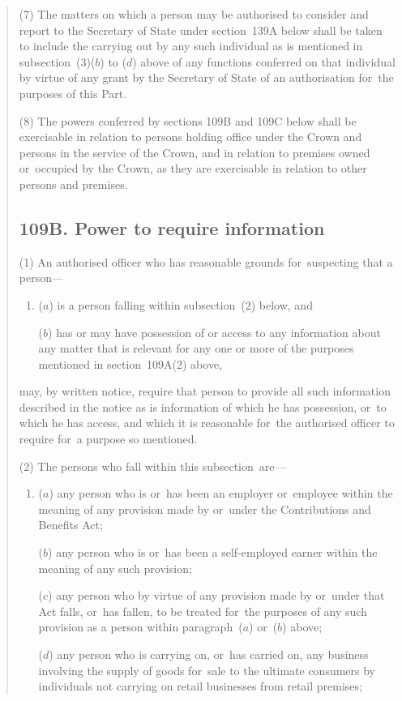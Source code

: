 \documentclass[12pt,a4paper]{article}
\begin{document}
\begin{quotation}
(7) The matters on which a person may be authorised to consider and report to the Secretary of State under section~139A below shall be taken to include the carrying out by any such individual as is mentioned in subsection~(3)($b$)  to ($d$)  above of any functions conferred on that individual by virtue of any grant by the Secretary of State of an authorisation for~the purposes of this Part.

(8) The powers conferred by sections 109B and 109C below shall be exercisable in relation to persons holding office under the Crown and persons in the service of the Crown, and in relation to premises owned or~occupied by the Crown, as they are exercisable in relation to other persons and premises.

\subsection*{109B. Power to require information}

(1) An authorised officer who has reasonable grounds for~suspecting that a person—
\begin{enumerate}\item[]
($a$) is a person falling within subsection~(2)  below, and

($b$) has or may have possession of or access to any information about any matter that is relevant for any one or more of the purposes mentioned in section~109A(2)  above,
\end{enumerate}
may, by written notice, require that person to provide all such information described in the notice as is information of which he has possession, or~to which he has access, and which it is reasonable for~the authorised officer to require for~a purpose so mentioned.

(2) The persons who fall within this subsection~are—
\begin{enumerate}\item[]
($a$) any person who is or~has been an employer or~employee within the meaning of any provision made by or~under the Contributions and Benefits Act;

($b$) any person who is or~has been a self-employed earner within the meaning of any such provision;

($c$) any person who by virtue of any provision made by or~under that Act falls, or~has fallen, to be treated for~the purposes of any such provision as a person within paragraph~($a$)  or~($b$)  above;

($d$) any person who is carrying on, or~has carried on, any business involving the supply of goods for~sale to the ultimate consumers by individuals not carrying on retail businesses from retail premises;


\end{enumerate}
\end{quotation}
\end{document}
